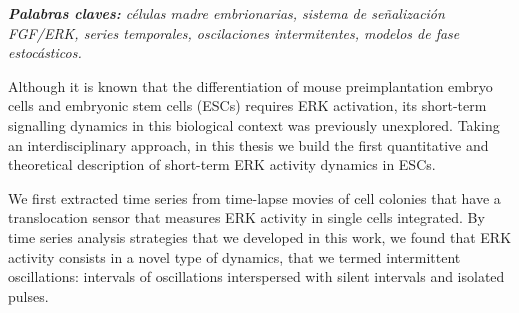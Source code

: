 \documentclass[./main.tex]{subfiles}
\begin{document}


\vspace{0.5cm}

\textit{\textbf{Palabras claves:} células madre embrionarias, sistema de señalización FGF/ERK, series temporales, oscilaciones intermitentes, modelos de fase estocásticos.}




Although it is known that the differentiation of mouse preimplantation embryo cells and embryonic stem cells (ESCs) requires ERK activation, its short-term signalling dynamics in this biological context was previously unexplored. Taking an interdisciplinary approach, in this thesis we build the first quantitative and theoretical description of short-term ERK activity dynamics in ESCs. 


We first extracted time series from time-lapse movies of cell colonies that have a translocation sensor that measures ERK activity in single cells integrated. By time series analysis strategies that we developed in this work, we found that ERK activity consists in a novel type of dynamics, that we termed intermittent oscillations: intervals of oscillations interspersed with silent intervals and isolated pulses.
\end{document}
